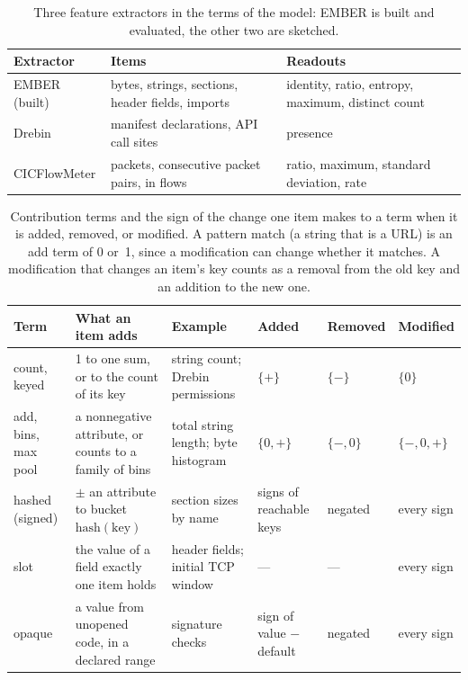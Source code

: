 
\begin{table}[t]
  \caption{Three feature extractors in the terms of the model: EMBER is built and evaluated, the other two are
  sketched.}
  \label{tab:fw:domains}
  \small
  \begin{tabular}{@{}p{}p{}p{}@{}}
    \toprule
    Extractor & Items & Readouts \\
    \midrule
    EMBER (built) & bytes, strings, sections, header fields, imports & identity, ratio, entropy, maximum, distinct count \\
    Drebin & manifest declarations, API call sites & presence \\
    CICFlowMeter & packets, consecutive packet pairs, in flows & ratio, maximum, standard deviation, rate \\
    \bottomrule
  \end{tabular}
\end{table}

\begin{table}[t]
  \caption{Contribution terms and the sign of the change one item makes to a term when it is added, removed, or
  modified. A pattern match (a string that is a URL) is an add term of 0 or~1, since a modification can change
  whether it matches. A modification that changes an item's key counts as a removal from the old key and an addition
  to the new one.}
  \label{tab:fw:terms}
  \small
  \begin{tabular}{@{}lp{}p{}lll@{}}
    \toprule
    Term & What an item adds & Example & Added & Removed & Modified \\
    \midrule
    count, keyed & 1 to one sum, or to the count of its key & string count; Drebin permissions & $\{+\}$ & $\{-\}$ & $\{0\}$ \\
    add, bins, max pool & a nonnegative attribute, or counts to a family of bins & total string length; byte histogram & $\{0,+\}$ & $\{-,0\}$ & $\{-,0,+\}$ \\
    hashed (signed) & $\pm$ an attribute to bucket $\mathrm{hash}(\text{key})$ & section sizes by name & signs of reachable keys & negated & every sign \\
    slot & the value of a field exactly one item holds & header fields; initial TCP window & --- & --- & every sign \\
    opaque & a value from unopened code, in a declared range & signature checks & sign of value $-$ default & negated & every sign \\
    \bottomrule
  \end{tabular}
\end{table}

